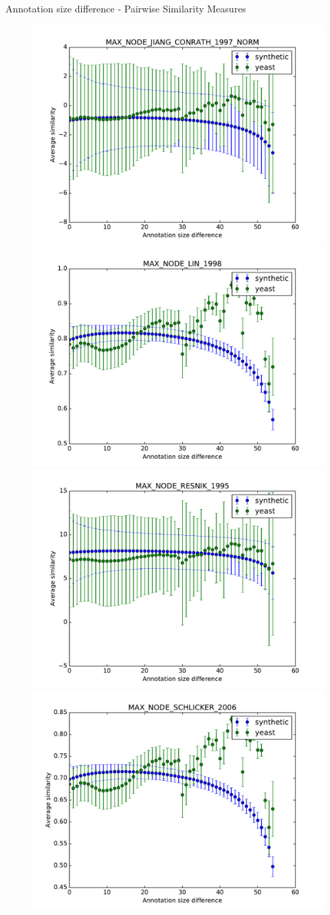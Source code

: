 \documentclass{beamer}
\begin{document}
\begin{frame}{Annotation size difference - Pairwise Similarity Measures}
\begin{figure}
\includegraphics[width=0.5\linewidth, height=0.4\textheight]{pairwise_diff/SIM_GROUPWISE_MAX_SIM_PAIRWISE_DAG_NODE_JIANG_CONRATH_1997_NORM_diff.pdf}
\includegraphics[width=0.5\linewidth, height=0.4\textheight]{pairwise_diff/SIM_GROUPWISE_MAX_SIM_PAIRWISE_DAG_NODE_LIN_1998_diff.pdf} \\
\includegraphics[width=0.5\linewidth, height=0.4\textheight]{pairwise_diff/SIM_GROUPWISE_MAX_SIM_PAIRWISE_DAG_NODE_RESNIK_1995_diff.pdf}
\includegraphics[width=0.5\linewidth, height=0.4\textheight]{pairwise_diff/SIM_GROUPWISE_MAX_SIM_PAIRWISE_DAG_NODE_SCHLICKER_2006_diff.pdf}
\end{figure}
\end{frame}
\end{document}
